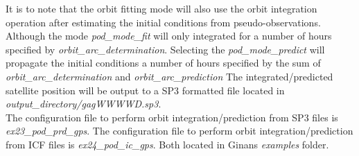 It is to note that the orbit fitting mode will also use the orbit integration operation after estimating the initial conditions from pseudo-observations. 
Although the  mode \textit{ pod\_mode\_fit} will only integrated for a number of hours specified  by \textit{orbit\_arc\_determination}.
Selecting the \textit{pod\_mode\_predict} will propagate the initial conditions a number of hours specified by the sum of \textit{orbit\_arc\_determination} and \textit{orbit\_arc\_prediction}
The integrated/predicted satellite position will be output to a SP3 formatted file located in \textit{output\_directory/gagWWWWD.sp3}.\\

The configuration file to perform orbit integration/prediction from SP3 files is \textit{ex23\_pod\_prd\_gps}.  
The configuration file to perform orbit integration/prediction from ICF files is \textit{ex24\_pod\_ic\_gps}. Both located in Ginans \textit{examples} folder.\\

